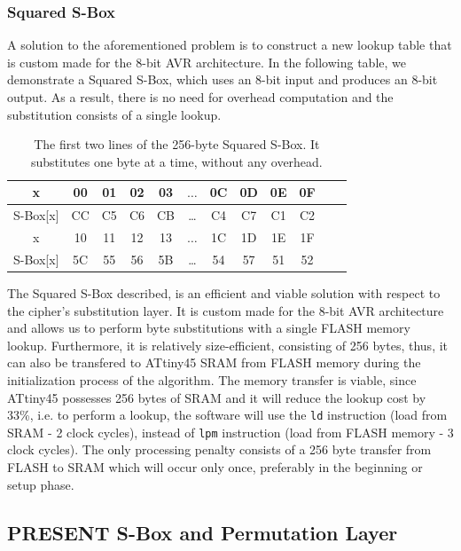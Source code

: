 \documentclass{llncs}
\begin{document}
\subsubsection{Squared S-Box}\label{ssbox}
A solution to the aforementioned problem is to construct a new lookup table that is custom made for the 8-bit AVR architecture. In the following table, we demonstrate a Squared S-Box, which uses an 8-bit input and produces an 8-bit output. As a result, there is no need for overhead computation and the substitution consists of a single lookup.\\
\begin{table}[h]
\centering
\begin{tabular}{| c | c  | c | c | c  | c  | c | c | c  | c | c | c |}
\hline
  x & 00 & 01 & 02 & 03  &  $\dots$  & 0C & 0D & 0E & 0F   \\
\hline
 S-Box[x] & CC & C5 & C6 & CB & \dots & C4 & C7 & C1 & C2   \\
\hline
  x & 10 & 11 & 12 & 13  &  $\dots$  & 1C & 1D & 1E & 1F   \\
\hline
 S-Box[x] & 5C & 55 & 56 & 5B & \dots & 54 & 57 & 51 & 52   \\

\hline
\end{tabular}
 \caption{\small The first two lines of the 256-byte Squared S-Box. It substitutes one byte at a time, without any overhead.}
\end{table}
The Squared S-Box described, is an efficient and viable solution with respect to the cipher's substitution layer. It is custom made for the 8-bit AVR architecture and allows us to perform byte substitutions with a single FLASH memory lookup. Furthermore, it is relatively size-efficient, consisting of 256 bytes, thus, it can also be transfered to ATtiny45 SRAM from FLASH memory during the initialization process of the algorithm. The memory transfer is viable, since ATtiny45 possesses 256 bytes of SRAM and it will reduce the lookup cost by 33\%, i.e. to perform a lookup, the software will use the \texttt{ld} instruction (load from SRAM - 2 clock cycles), instead of  \texttt{lpm} instruction (load from FLASH memory - 3 clock cycles). The only processing penalty consists of a 256 byte transfer from FLASH to SRAM which will occur only once, preferably in the beginning or setup phase.
\subsection{PRESENT S-Box and Permutation Layer}
\end{document}
